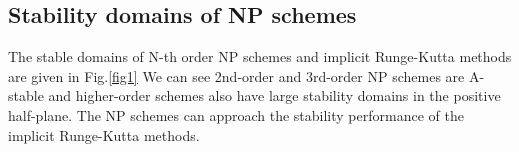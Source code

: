 \documentclass[review]{elsarticle}
\theoremstyle{plain}\newtheorem{definition}{\sc{Definition}}
\theoremstyle{defination}\newtheorem{example}{Example}[section]
\numberwithin{equation}{section}
\numberwithin{table}{section}
\begin{document}
{\subsection{Stability domains of NP schemes}
The stable domains of N-th order NP schemes and implicit Runge-Kutta methods are given in Fig.\ref{fig1}  We can see 2nd-order and 3rd-order NP schemes are A-stable and higher-order schemes also have large stability domains in the  positive half-plane. The NP schemes can approach  the stability  performance  of  the  implicit Runge-Kutta methods.  

\begin{figure}
  \centering
\end{figure}}
\end{document}
